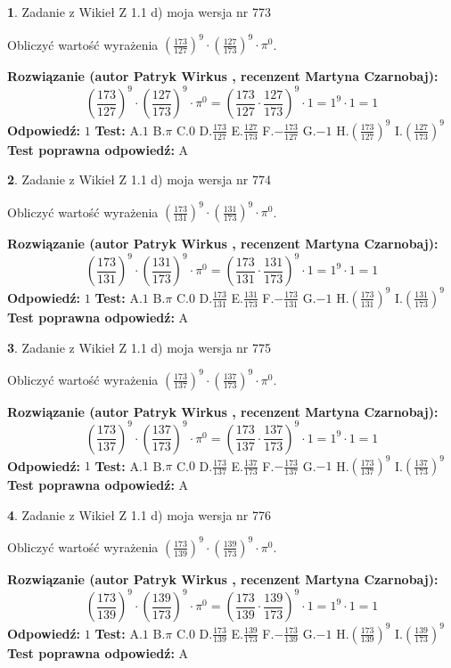 \documentclass[12pt, a4paper]{article}
\theoremstyle{definition} %
\newtheorem{zad}{}
\newcommand{\zadStart}[1]{\begin{zad}#1\newline}
\newcommand{\zadStop}{\end{zad}}
\newcommand{\rozwStart}[2]{\noindent \textbf{Rozwiązanie (autor #1 , recenzent #2): }\newline}
\newcommand{\rozwStop}{\newline}
\newcommand{\odpStart}{\noindent \textbf{Odpowiedź:}\newline}
\newcommand{\odpStop}{\newline}
\newcommand{\testStart}{\noindent \textbf{Test:}\newline}
\newcommand{\testStop}{\newline}
\newcommand{\kluczStart}{\noindent \textbf{Test poprawna odpowiedź:}\newline}
\newcommand{\kluczStop}{\newline}
\begin{document}
\zadStart{Zadanie z Wikieł Z 1.1 d) moja wersja nr 773}

Obliczyć wartość wyrażenia $(\frac{173}{127})^{9} \cdot (\frac{127}{173})^{9} \cdot \pi^{0}$.
\zadStop
\rozwStart{Patryk Wirkus}{Martyna Czarnobaj}
$$(\frac{173}{127})^{9} \cdot (\frac{127}{173})^{9} \cdot \pi^{0} = (\frac{173}{127} \cdot \frac{127}{173})^{9} \cdot 1 = 1^{9} \cdot 1 = 1$$
\rozwStop
\odpStart
$1$
\odpStop
\testStart
A.$1$ B.$\pi$ C.$0$ D.$\frac{173}{127}$ E.$\frac{127}{173}$
F.$-\frac{173}{127}$ G.$-1$
H.$(\frac{173}{127})^{9}$
I.$(\frac{127}{173})^{9}$
\testStop
\kluczStart
A
\kluczStop



\zadStart{Zadanie z Wikieł Z 1.1 d) moja wersja nr 774}

Obliczyć wartość wyrażenia $(\frac{173}{131})^{9} \cdot (\frac{131}{173})^{9} \cdot \pi^{0}$.
\zadStop
\rozwStart{Patryk Wirkus}{Martyna Czarnobaj}
$$(\frac{173}{131})^{9} \cdot (\frac{131}{173})^{9} \cdot \pi^{0} = (\frac{173}{131} \cdot \frac{131}{173})^{9} \cdot 1 = 1^{9} \cdot 1 = 1$$
\rozwStop
\odpStart
$1$
\odpStop
\testStart
A.$1$ B.$\pi$ C.$0$ D.$\frac{173}{131}$ E.$\frac{131}{173}$
F.$-\frac{173}{131}$ G.$-1$
H.$(\frac{173}{131})^{9}$
I.$(\frac{131}{173})^{9}$
\testStop
\kluczStart
A
\kluczStop



\zadStart{Zadanie z Wikieł Z 1.1 d) moja wersja nr 775}

Obliczyć wartość wyrażenia $(\frac{173}{137})^{9} \cdot (\frac{137}{173})^{9} \cdot \pi^{0}$.
\zadStop
\rozwStart{Patryk Wirkus}{Martyna Czarnobaj}
$$(\frac{173}{137})^{9} \cdot (\frac{137}{173})^{9} \cdot \pi^{0} = (\frac{173}{137} \cdot \frac{137}{173})^{9} \cdot 1 = 1^{9} \cdot 1 = 1$$
\rozwStop
\odpStart
$1$
\odpStop
\testStart
A.$1$ B.$\pi$ C.$0$ D.$\frac{173}{137}$ E.$\frac{137}{173}$
F.$-\frac{173}{137}$ G.$-1$
H.$(\frac{173}{137})^{9}$
I.$(\frac{137}{173})^{9}$
\testStop
\kluczStart
A
\kluczStop



\zadStart{Zadanie z Wikieł Z 1.1 d) moja wersja nr 776}

Obliczyć wartość wyrażenia $(\frac{173}{139})^{9} \cdot (\frac{139}{173})^{9} \cdot \pi^{0}$.
\zadStop
\rozwStart{Patryk Wirkus}{Martyna Czarnobaj}
$$(\frac{173}{139})^{9} \cdot (\frac{139}{173})^{9} \cdot \pi^{0} = (\frac{173}{139} \cdot \frac{139}{173})^{9} \cdot 1 = 1^{9} \cdot 1 = 1$$
\rozwStop
\odpStart
$1$
\odpStop
\testStart
A.$1$ B.$\pi$ C.$0$ D.$\frac{173}{139}$ E.$\frac{139}{173}$
F.$-\frac{173}{139}$ G.$-1$
H.$(\frac{173}{139})^{9}$
I.$(\frac{139}{173})^{9}$
\testStop
\kluczStart
A
\kluczStop
\end{document}
